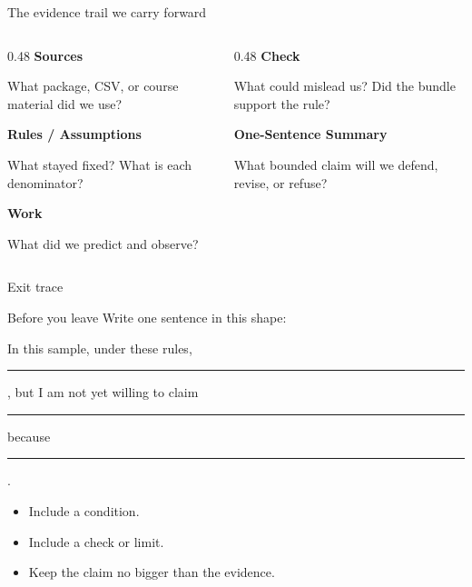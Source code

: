 \begin{frame}{The evidence trail we carry forward}
\begin{columns}[T]
\begin{column}{0.48\textwidth}
\textbf{Sources}\par
What package, CSV, or course material did we use?\par\vspace{6pt}
\textbf{Rules / Assumptions}\par
What stayed fixed? What is each denominator?\par\vspace{6pt}
\textbf{Work}\par
What did we predict and observe?
\end{column}
\begin{column}{0.48\textwidth}
\textbf{Check}\par
What could mislead us? Did the bundle support the rule?\par\vspace{6pt}
\textbf{One-Sentence Summary}\par
What bounded claim will we defend, revise, or refuse?\par\vspace{10pt}
\end{column}
\end{columns}
\end{frame}

\begin{frame}{Exit trace}
\begin{block}{Before you leave}
Write one sentence in this shape:
\end{block}
\begin{center}
\large In this sample, under these rules, \rule{2.7cm}{0.4pt}, but I am not yet willing to claim \rule{2.7cm}{0.4pt} because \rule{2.7cm}{0.4pt}.
\end{center}
\vspace{8pt}
\begin{itemize}
\item Include a condition.
\item Include a check or limit.
\item Keep the claim no bigger than the evidence.
\end{itemize}
\end{frame}
